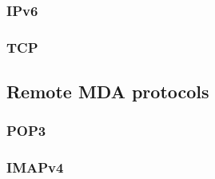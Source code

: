 \subsubsection{IPv6}
\cite{RFC2460}

\subsubsection{TCP}

\subsection{Remote MDA protocols}
\subsubsection{POP3}
\cite{RFC1939}

\subsubsection{IMAPv4}
\cite{RFC3501}

